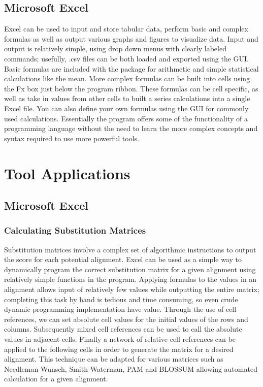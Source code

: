     \subsection{Microsoft Excel}
    Excel can be used to input and store tabular data, perform basic and complex formulas as well as output various graphs and figures to visualize data.\autocite{B4} Input and output is relatively simple, using drop down menus with clearly labeled commands; usefully, .csv files can be both loaded and exported using the GUI.\autocite{B4} Basic formulas are included with the package for arithmetic and simple statistical calculations like the mean. More complex formulas can be built into cells using the Fx box just below the program ribbon. These formulas can be cell specific, as well as take in values from other cells to built a series calculations into a single Excel file.\autocite{B4} You can also define your own formulas using the GUI for commonly used calculations. Essentially the program offers some of the functionality of a programming language without the need to learn the more complex concepts and syntax required to use more powerful tools.

\section{Tool Applications}

    \subsection{Microsoft Excel}

    \subsubsection{Calculating Substitution Matrices} 
    
    Substitution matrices involve a complex set of algorithmic instructions to output the score for each potential alignment.\autocite{T2} Excel can be used as a simple way to dynamically program the correct substitution matrix for a given alignment using relatively simple functions in the program. Applying formulas to the values in an alignment allows input of relatively few values while outputting the entire matrix; completing this task by hand is tedious and time consuming, so even crude dynamic programming implementation have value\autocite{L2}. Through the use of cell references, we can set absolute cell values for the initial values of the rows and columns.\autocite{L2} Subsequently mixed cell references can be used to call the absolute values in adjacent cells.\autocite{T2} Finally a network of relative cell references can be applied to the following cells in order to generate the matrix for a desired alignment.\autocite{T2} This technique can be adapted for various matrices such as Needleman-Wunsch, Smith-Waterman, PAM and BLOSSUM allowing automated calculation for a given alignment.
